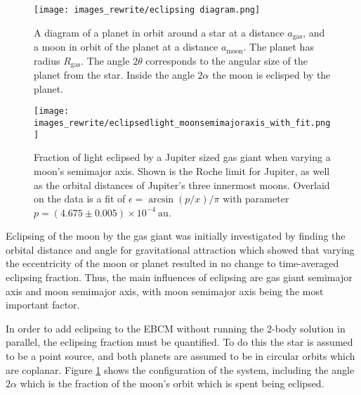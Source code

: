 \documentclass[12pt, onecolumn]{revtex4-2}    %
\begin{document}
\begin{figure}
  \texttt{[image: images\_rewrite/eclipsing diagram.png]}
  \caption{
    A diagram of a planet in orbit around a star at a distance $a_{\text{gas}}$, and a moon in orbit of the planet at a distance $a_{\text{moon}}$.
    The planet has radius $R_\text{gas}$.
    The angle $2\theta$ corresponds to the angular size of the planet from the star.
    Inside the angle $2\alpha$ the moon is eclisped by the planet.
  }
  \label{fig:quantitative_eclipsing}
\end{figure}

\begin{figure}
  \texttt{[image: images\_rewrite/eclipsedlight\_moonsemimajoraxis\_with\_fit.png]}
  \caption{
    Fraction of light eclipsed by a Jupiter sized gas giant when varying a moon's semimajor axis.
    Shown is the Roche limit for Jupiter, as well as the orbital distances of Jupiter's three innermost moons.
    Overlaid on the data is a fit of $\epsilon = \arcsin(p/x)/\pi$ with parameter $p = (4.675\pm0.005)\times 10^{-4}\ \text{au}$.
  }
  \label{fig:quantitative_eclipsing_moon_semimajor_axis}
\end{figure}

Eclipsing of the moon by the gas giant was initially investigated by finding the orbital distance and angle  for gravitational attraction which showed that varying the eccentricity of the moon or planet resulted in no change to time-averaged eclipsing fraction.
Thus, the main influences of eclipsing are gas giant semimajor axis and moon semimajor axis, with moon semimajor axis being the most important factor.

In order to add eclipsing to the EBCM without running the 2-body solution in parallel, the eclipsing fraction must be quantified.
To do this the star is assumed to be a point source, and both planets are assumed to be in circular orbits which are coplanar.
Figure \ref{fig:quantitative_eclipsing} shows the configuration of the system, including the angle $2\alpha$ which is the fraction of the moon's orbit which is spent being eclipsed.
\end{document}

